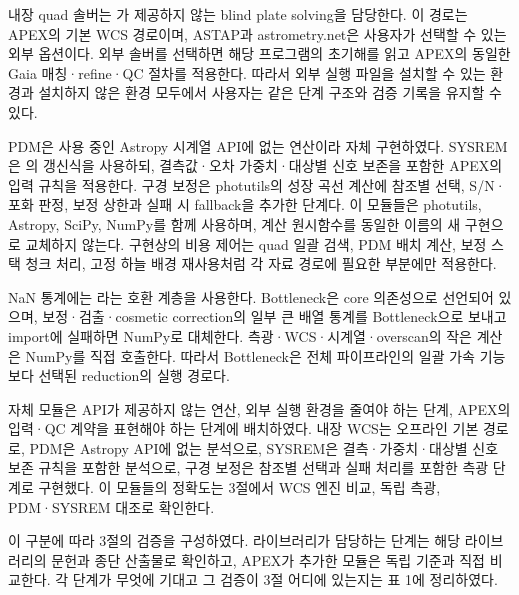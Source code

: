 내장 quad 솔버는 \texttt{}가 제공하지 않는 blind plate solving을 담당한다. 이 경로는 APEX의 기본 WCS 경로이며, ASTAP과 astrometry.net은 사용자가 선택할 수 있는 외부 옵션이다. 외부 솔버를 선택하면 해당 프로그램의 초기해를 읽고 APEX의 동일한 Gaia 매칭·refine·QC 절차를 적용한다. 따라서 외부 실행 파일을 설치할 수 있는 환경과 설치하지 않은 환경 모두에서 사용자는 같은 단계 구조와 검증 기록을 유지할 수 있다.



PDM은 사용 중인 Astropy 시계열 API에 없는 연산이라 자체 구현하였다. SYSREM은 \citet{tamuz2005}의 갱신식을 사용하되, 결측값·오차 가중치·대상별 신호 보존을 포함한 APEX의 입력 규칙을 적용한다. 구경 보정은 photutils의 성장 곡선 계산에 참조별 선택, S/N·포화 판정, 보정 상한과 실패 시 fallback을 추가한 단계다. 이 모듈들은 photutils, Astropy, SciPy, NumPy를 함께 사용하며, 계산 원시함수를 동일한 이름의 새 구현으로 교체하지 않는다. 구현상의 비용 제어는 quad 일괄 검색, PDM 배치 계산, 보정 스택 청크 처리, 고정 하늘 배경 재사용처럼 각 자료 경로에 필요한 부분에만 적용한다.



NaN 통계에는 \texttt{}라는 호환 계층을 사용한다. Bottleneck은 core 의존성으로 선언되어 있으며, 보정·검출·cosmetic correction의 일부 큰 배열 통계를 Bottleneck으로 보내고 import에 실패하면 NumPy로 대체한다. 측광·WCS·시계열·overscan의 작은 계산은 NumPy를 직접 호출한다. 따라서 Bottleneck은 전체 파이프라인의 일괄 가속 기능보다 선택된 reduction의 실행 경로다.



자체 모듈은 API가 제공하지 않는 연산, 외부 실행 환경을 줄여야 하는 단계, APEX의 입력·QC 계약을 표현해야 하는 단계에 배치하였다. 내장 WCS는 오프라인 기본 경로로, PDM은 Astropy API에 없는 분석으로, SYSREM은 결측·가중치·대상별 신호 보존 규칙을 포함한 분석으로, 구경 보정은 참조별 선택과 실패 처리를 포함한 측광 단계로 구현했다. 이 모듈들의 정확도는 3절에서 WCS 엔진 비교, 독립 측광, PDM·SYSREM 대조로 확인한다.



이 구분에 따라 3절의 검증을 구성하였다. 라이브러리가 담당하는 단계는 해당 라이브러리의 문헌과 종단 산출물로 확인하고, APEX가 추가한 모듈은 독립 기준과 직접 비교한다. 각 단계가 무엇에 기대고 그 검증이 3절 어디에 있는지는 표 1에 정리하였다.



